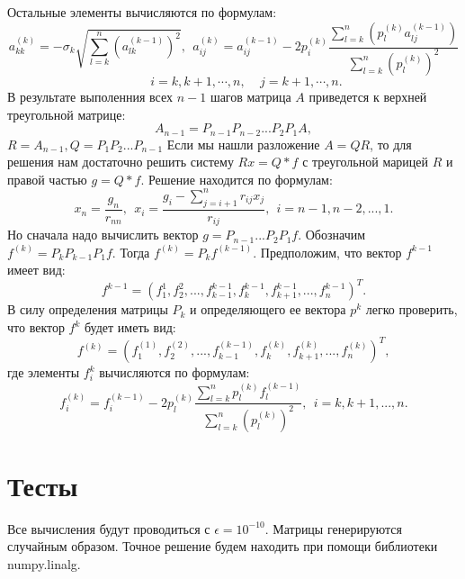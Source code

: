 \documentclass[14pt, titlepage,fleqn]{extarticle}
\begin{document}
	Остальные элементы вычисляются по формулам:
	\[a^{(k)}_{kk} = -\sigma_k \sqrt{\sum^{n}_{l=k}(a^{(k-1)}_{lk})^2}, ~~ a^{(k)}_{ij} = a^{(k-1)}_{ij} - 2p^{(k)}_{i} \dfrac{\sum^{n}_{l=k}(p^{(k)}_{l}a^{(k-1)}_{lj})}{\sum^{n}_{l=k}(p^{(k)}_{l})^2}\]
	\[~~~~~~~~~i = k, k+1, \cdots, n,~~~~~j=k+1,\cdots,n.\]
	\newpage
	В результате выполенния всех $n-1$ шагов матрица $A$ приведется к верхней треугольной матрице:
	\[A_{n-1} = P_{n-1}P_{n-2}...P_2P_1A,\]
	$R = A_{n-1}, Q = P_1P_2...P_{n-1}$
	Если мы нашли разложение $A = QR$, то для решения нам достаточно решить систему $Rx= Q*f$ с треугольной марицей $R$ и правой частью $g=Q*f$. Решение находится по формулам:
	\[x_n = \dfrac{g_n}{r_{nn}},~~ x_i = \dfrac{g_i - \sum^{n}_{j=i+1}r_{ij}x_j}{r_{ij}}, ~~i = n-1, n-2,...,1.\]
	Но сначала надо вычислить вектор $g = P_{n-1}...P_2P_1f.$ Обозначим $f^{(k)} = P_kP_{k-1}P_1f.$ Тогда $f^{(k)} = P_kf^{(k-1)}.$ Предположим, что вектор $f^{k-1}$ имеет вид:
	\[f^{k-1} = (f^{1}_{1}, f^{2}_{2},...,f^{k-1}_{k-1},f^{k-1}_{k},f^{k-1}_{k+1},...,f^{k-1}_{n})^T.\]
	В силу определения матрицы $P_k$ и определяющего ее вектора $p^k$ легко проверить, что вектор $f^k$ будет иметь вид:
	\[f^{(k)} = (f^{(1)}_{1}, f^{(2)}_{2}, ..., f^{(k-1)}_{k-1}, f^{(k)}_{k}, f^{(k)}_{k+1},...,f^{(k)}_{n})^T,\]
	где элементы $f^k_i$ вычисляются по формулам:
	\[f^{(k)}_{i} = f^{(k - 1)}_{i} - 2p^{(k)}_{l} \dfrac{\sum^{n}_{l=k}p^{(k)}_{l}f^{(k-1)}_{l}}{\sum^{n}_{l=k}(p^{(k)}_{l})^2},~~ i = k,k+1,...,n.\]
	\newpage
	\section*{Тесты}
	Все вычисления будут проводиться с $\epsilon=10^{-10}$.
	Матрицы генерируются случайным образом.
	Точное решение будем находить при помощи библиотеки numpy.linalg.
\end{document}
